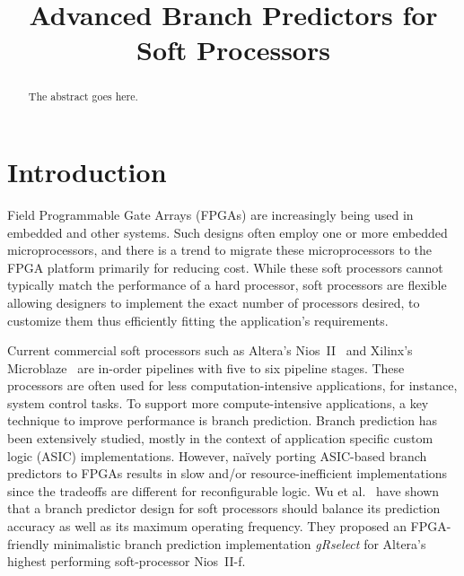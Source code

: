 \documentclass[conference]{IEEEtran}
\begin{document}
\title{Advanced Branch Predictors for Soft Processors}


\author{
}

\maketitle


\begin{abstract}
The abstract goes here.


\end{abstract}


\IEEEpeerreviewmaketitle


\section{Introduction}
\label{sec:intro}
Field Programmable Gate Arrays (FPGAs) are increasingly being used in embedded and other systems. Such designs often employ one or more embedded microprocessors, and there is a trend to migrate these microprocessors to the FPGA platform primarily for reducing cost. While these soft processors cannot typically match the performance of a hard processor, soft processors are flexible allowing designers to implement the exact number of processors desired, to customize them thus efficiently fitting the application's requirements.

Current commercial soft processors such as Altera's Nios~II~\cite{niosii} and Xilinx's Microblaze~\cite{microblaze} are in-order pipelines with five to six pipeline stages. These processors are often used for less computation-intensive applications, for instance, system control tasks. To support more compute-intensive applications, a key technique to improve performance is branch prediction. Branch prediction has been extensively studied, mostly in the context of application specific custom logic (ASIC) implementations. However, na\"ively porting ASIC-based branch predictors to FPGAs results in slow and/or resource-inefficient implementations since the tradeoffs are different for reconfigurable logic. Wu et al.~\cite{grselect} have shown that a branch predictor design for soft processors should balance its prediction accuracy as well as its maximum operating frequency. They proposed an FPGA-friendly minimalistic branch prediction implementation \textit{gRselect} for Altera's highest performing soft-processor Nios~II-f.
\end{document}
